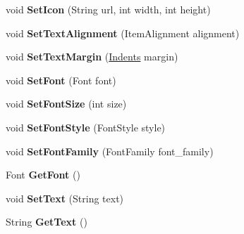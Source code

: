 \begin{DoxyCompactItemize}
\mbox{\label{class_space_v_i_l_1_1_title_bar_a8467aef4870ae71ad71987c415bfc1ca}} 
void {\bfseries Set\+Icon} (String url, int width, int height)
\item 
\mbox{\label{class_space_v_i_l_1_1_title_bar_a4829092a945c644e6d04d9583dc20baa}} 
void {\bfseries Set\+Text\+Alignment} (Item\+Alignment alignment)
\item 
\mbox{\label{class_space_v_i_l_1_1_title_bar_ae25bda22c23e66381c81178fb5d9cc3b}} 
void {\bfseries Set\+Text\+Margin} (\mbox{\hyperlink{struct_space_v_i_l_1_1_decorations_1_1_indents}{Indents}} margin)
\item 
\mbox{\label{class_space_v_i_l_1_1_title_bar_ab7213890047e7e2ca00fd0bfca06081c}} 
void {\bfseries Set\+Font} (Font font)
\item 
\mbox{\label{class_space_v_i_l_1_1_title_bar_add6ab8f88cab39dbf9d95a938ce957ad}} 
void {\bfseries Set\+Font\+Size} (int size)
\item 
\mbox{\label{class_space_v_i_l_1_1_title_bar_a17a595ec261cc4776be702c52be3abe1}} 
void {\bfseries Set\+Font\+Style} (Font\+Style style)
\item 
\mbox{\label{class_space_v_i_l_1_1_title_bar_a6363af621e61e46a9ee43c8f6900b733}} 
void {\bfseries Set\+Font\+Family} (Font\+Family font\+\_\+family)
\item 
\mbox{\label{class_space_v_i_l_1_1_title_bar_a43a54e41e87bb192553421e8aef24c8c}} 
Font {\bfseries Get\+Font} ()
\item 
\mbox{\label{class_space_v_i_l_1_1_title_bar_abbada53b0c1d4623d10e43f864b757ea}} 
void {\bfseries Set\+Text} (String text)
\item 
\mbox{\label{class_space_v_i_l_1_1_title_bar_a87a0b5b95f620d9cc8b6c44c830e227b}} 
String {\bfseries Get\+Text} ()
\item 

\end{DoxyCompactItemize}
